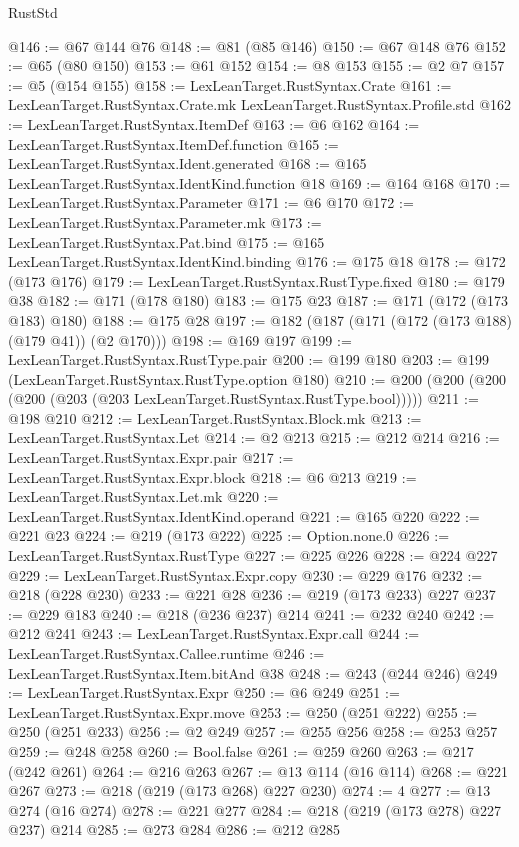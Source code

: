 \begin{lexlean}{RustStd}
\begin{coremodule}
@146 := @67 @144 @76
@148 := @81 (@85 @146)
@150 := @67 @148 @76
@152 := @65 (@80 @150)
@153 := @61 @152
@154 := @8 @153
@155 := @2 @7
@157 := @5 (@154 @155)
@158 := LexLeanTarget.RustSyntax.Crate
@161 := LexLeanTarget.RustSyntax.Crate.mk LexLeanTarget.RustSyntax.Profile.std
@162 := LexLeanTarget.RustSyntax.ItemDef
@163 := @6 @162
@164 := LexLeanTarget.RustSyntax.ItemDef.function
@165 := LexLeanTarget.RustSyntax.Ident.generated
@168 := @165 LexLeanTarget.RustSyntax.IdentKind.function @18
@169 := @164 @168
@170 := LexLeanTarget.RustSyntax.Parameter
@171 := @6 @170
@172 := LexLeanTarget.RustSyntax.Parameter.mk
@173 := LexLeanTarget.RustSyntax.Pat.bind
@175 := @165 LexLeanTarget.RustSyntax.IdentKind.binding
@176 := @175 @18
@178 := @172 (@173 @176)
@179 := LexLeanTarget.RustSyntax.RustType.fixed
@180 := @179 @38
@182 := @171 (@178 @180)
@183 := @175 @23
@187 := @171 (@172 (@173 @183) @180)
@188 := @175 @28
@197 := @182 (@187 (@171 (@172 (@173 @188) (@179 @41)) (@2 @170)))
@198 := @169 @197
@199 := LexLeanTarget.RustSyntax.RustType.pair
@200 := @199 @180
@203 := @199 (LexLeanTarget.RustSyntax.RustType.option @180)
@210 := @200 (@200 (@200 (@200 (@203 (@203 LexLeanTarget.RustSyntax.RustType.bool)))))
@211 := @198 @210
@212 := LexLeanTarget.RustSyntax.Block.mk
@213 := LexLeanTarget.RustSyntax.Let
@214 := @2 @213
@215 := @212 @214
@216 := LexLeanTarget.RustSyntax.Expr.pair
@217 := LexLeanTarget.RustSyntax.Expr.block
@218 := @6 @213
@219 := LexLeanTarget.RustSyntax.Let.mk
@220 := LexLeanTarget.RustSyntax.IdentKind.operand
@221 := @165 @220
@222 := @221 @23
@224 := @219 (@173 @222)
@225 := Option.none.{0}
@226 := LexLeanTarget.RustSyntax.RustType
@227 := @225 @226
@228 := @224 @227
@229 := LexLeanTarget.RustSyntax.Expr.copy
@230 := @229 @176
@232 := @218 (@228 @230)
@233 := @221 @28
@236 := @219 (@173 @233) @227
@237 := @229 @183
@240 := @218 (@236 @237) @214
@241 := @232 @240
@242 := @212 @241
@243 := LexLeanTarget.RustSyntax.Expr.call
@244 := LexLeanTarget.RustSyntax.Callee.runtime
@246 := LexLeanTarget.RustSyntax.Item.bitAnd @38
@248 := @243 (@244 @246)
@249 := LexLeanTarget.RustSyntax.Expr
@250 := @6 @249
@251 := LexLeanTarget.RustSyntax.Expr.move
@253 := @250 (@251 @222)
@255 := @250 (@251 @233)
@256 := @2 @249
@257 := @255 @256
@258 := @253 @257
@259 := @248 @258
@260 := Bool.false
@261 := @259 @260
@263 := @217 (@242 @261)
@264 := @216 @263
@267 := @13 @114 (@16 @114)
@268 := @221 @267
@273 := @218 (@219 (@173 @268) @227 @230)
@274 := 4
@277 := @13 @274 (@16 @274)
@278 := @221 @277
@284 := @218 (@219 (@173 @278) @227 @237) @214
@285 := @273 @284
@286 := @212 @285

\end{coremodule}
\end{lexlean}
